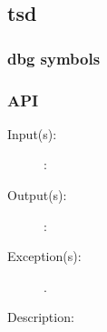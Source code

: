%
%
%
%
%              

\label{tsd}
\subsection{tsd}

\subsubsection{dbg symbols}

\subsubsection{API}
\begin{description}
\label{tsd_}
\item[{\cfunc[]{tsd\_}{}}: ]
	\begin{description}\item[]
	\item[Input(s): ]
		\begin{description}\item[]
		\item[: ]
		\end{description}
	\item[Output(s): ]
		\begin{description}\item[]
		\item[: ]
		\end{description}
	\item[Exception(s): ]
		\begin{description}\item[]
		\item[.]
		\end{description}
	\item[Description: ]
	\end{description}
\end{description}
